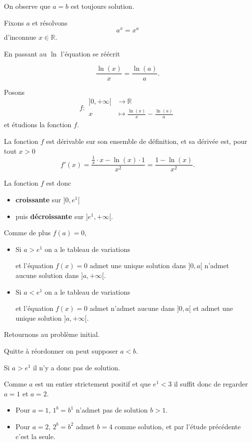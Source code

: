 \begin{sol}
  On observe que $a=b$ est toujours solution.



  Fixons $a$ et résolvons
  $$a^x = x^a$$
  d'inconnue $x \in \mathbb{R}$.

  En passant au $\ln$ l'équation se réécrit

  $$\frac{\ln(x)}{x} = \frac{\ln(a)}{a}.$$

  Posons
  $$f : \begin{aligned}
      ]0,+\infty[ & \to \mathbb{R}                              \\
      x           & \mapsto \frac{\ln(x)}{x} - \frac{\ln(a)}{a}
    \end{aligned}$$
  et étudions la fonction $f$.

  La fonction $f$ est dérivable sur son ensemble de définition, et sa dérivée est, pour tout $x > 0$
  $$f'(x) = \frac{\frac{1}{x} \cdot x - \ln(x) \cdot 1}{x^2} = \frac{1-\ln(x)}{x^2}.$$

  La fonction $f$ est donc
  \begin{itemize}
    \item \textbf{croissante} sur $]0,e^1[$
    \item puis \textbf{décroissante} sur $]e^1,+\infty[$.
  \end{itemize}

  Comme de plus $f(a)=0$,

  \begin{itemize}
    \item Si $a > e^1$ on a le tableau de variations


          et l'équation $f(x) = 0$ admet une unique solution dans $]0,a[$ n'admet aucune solution dans $]a,+\infty[$.
    \item Si $a < e^1$ on a le tableau de variations


          et l'équation $f(x) = 0$ admet n'admet aucune dans $]0,a[$ et admet une unique solution $]a,+\infty[$.
  \end{itemize}

  Retournons au problème initial.

  Quitte à réordonner on peut supposer $a < b$.

  Si $a>e^1$ il n'y a donc pas de solution.

  Comme $a$ est un entier strictement positif et que $e^1 < 3$ il suffit donc de regarder $a=1$ et $a=2$.

  \begin{itemize}
    \item Pour $a=1$, $1^b = b^1$ n'admet pas de solution $b > 1$.
    \item Pour $a=2$, $2^b = b^2$ admet $b=4$ comme solution, et par l'étude précédente c'est la seule.
  \end{itemize}


\end{sol}
